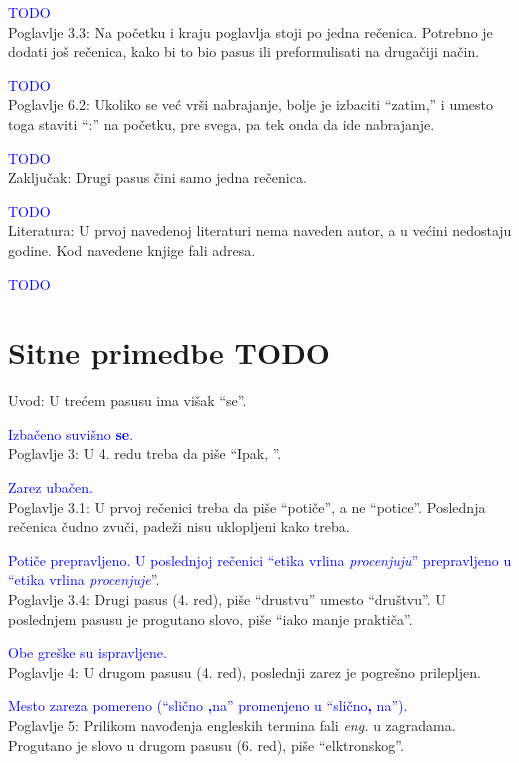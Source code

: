 \documentclass[a4paper]{report}
\newcommand{\odgovor}[1]{\textcolor{blue}{#1}}
\begin{document}
\odgovor{TODO}
\\\textbullet Poglavlje 3.3: Na početku i kraju poglavlja stoji po jedna rečenica. Potrebno je dodati još rečenica, kako bi to bio pasus ili preformulisati na drugačiji način.

\odgovor{TODO}
\\\textbullet Poglavlje 6.2: Ukoliko se već vrši nabrajanje, bolje je izbaciti “zatim,” i umesto toga staviti “:” na početku, pre svega, pa tek onda da ide nabrajanje.

\odgovor{TODO}
\\\textbullet Zaključak: Drugi pasus čini samo jedna rečenica.

\odgovor{TODO}
\\\textbullet Literatura: U prvoj navedenoj literaturi nema naveden autor, a u većini nedostaju godine. Kod navedene knjige fali adresa.

\odgovor{TODO}

\section{Sitne primedbe TODO}
\textbullet Uvod: U trećem pasusu ima višak “se”.

\odgovor{Izbačeno suvišno \textbf{se}.}
\\\textbullet Poglavlje 3: U 4. redu treba da piše “Ipak, ”.

\odgovor{Zarez ubačen.}
\\\textbullet Poglavlje 3.1: U prvoj rečenici treba da piše “potiče”, a ne “potice”. Poslednja rečenica čudno zvuči, padeži nisu uklopljeni kako treba.

\odgovor{Potiče prepravljeno. U poslednjoj rečenici ``etika vrlina \textit{procenjuju}'' prepravljeno u ``etika vrlina \textit{procenjuje}}''.
\\\textbullet Poglavlje 3.4: Drugi pasus (4. red), piše “drustvu” umesto “društvu”. U poslednjem pasusu je progutano slovo, piše “iako manje praktiča”.

\odgovor{Obe greške su ispravljene.}
\\\textbullet Poglavlje 4: U drugom pasusu (4. red), poslednji zarez je pogrešno prilepljen.

\odgovor{Mesto zareza pomereno (``slično \textbf{,}na'' promenjeno u ``slično\textbf{,} na'').}
\\\textbullet Poglavlje 5: Prilikom navođenja engleskih termina fali \textit{eng.} u zagradama.
	Progutano je slovo u drugom pasusu (6. red), piše “elktronskog”.
	
\end{document}

